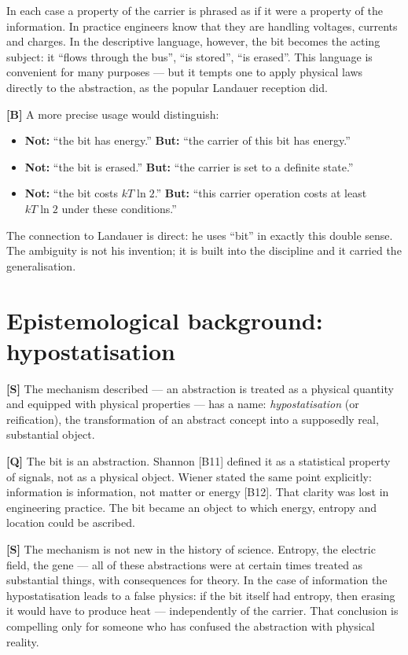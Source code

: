 In each case a property of the carrier is phrased as if it were a property of the
information. In practice engineers know that they are handling voltages, currents
and charges. In the descriptive language, however, the bit becomes the acting
subject: it “flows through the bus”, “is stored”, “is erased”. This language is
convenient for many purposes --- but it tempts one to apply physical laws directly
to the abstraction, as the popular Landauer reception did.

\textbf{[B]} A more precise usage would distinguish:

\begin{itemize}[leftmargin=1.4em,itemsep=0.25em]
  \item \textbf{Not:} “the bit has energy.” \quad
        \textbf{But:} “the carrier of this bit has energy.”
  \item \textbf{Not:} “the bit is erased.” \quad
        \textbf{But:} “the carrier is set to a definite state.”
  \item \textbf{Not:} “the bit costs $kT\ln 2$.” \quad
        \textbf{But:} “this carrier operation costs at least $kT\ln 2$ under these
        conditions.”
\end{itemize}

The connection to Landauer is direct: he uses “bit” in exactly this double sense.
The ambiguity is not his invention; it is built into the discipline and it carried
the generalisation.

\section{Epistemological background: hypostatisation}

\textbf{[S]} The mechanism described --- an abstraction is treated as a physical quantity
and equipped with physical properties --- has a name: \emph{hypostatisation} (or
reification), the transformation of an abstract concept into a supposedly real,
substantial object.

\textbf{[Q]} The bit is an abstraction. Shannon [B11] defined it as a statistical property
of signals, not as a physical object. Wiener stated the same point explicitly:
information is information, not matter or energy [B12]. That clarity was lost in
engineering practice. The bit became an object to which energy, entropy and
location could be ascribed.

\textbf{[S]} The mechanism is not new in the history of science. Entropy, the electric
field, the gene --- all of these abstractions were at certain times treated as
substantial things, with consequences for theory. In the case of information the
hypostatisation leads to a false physics: if the bit itself had entropy, then
erasing it would have to produce heat --- independently of the carrier. That
conclusion is compelling only for someone who has confused the abstraction with
physical reality.

